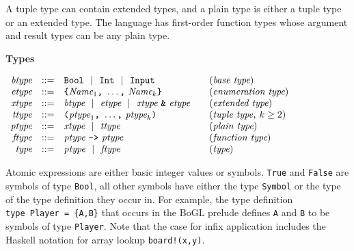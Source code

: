 \documentclass[11pt]{article}
\makeatletter
\newcommand{\prodName}[1]{&(\emph{#1})\\}
\newcommand{\nt}[1]{\textit{#1}}
\newcommand{\prog}[1]{\texttt{#1}}
\newcommand{\ORil}{\ \ |\ \ }
\newcommand{\IS}{&::=&}
\newcommand{\OR}{&|&}
\newcommand{\syntax}[2]{
  \needspace{3\baselineskip}
  \bigskip\par\noindent\textbf{#1}\par\smallskip%
  $\begin{array}{rcl@{\qquad}l}#2\end{array}$%
  \par\bigskip\noindent\ignorespaces
}
\newcommand{\lp}{\prog{(}}
\newcommand{\rp}{\prog{)}}
\newcommand{\paren}[1]{\lp#1\rp}
\makeatother
\begin{document}
A tuple type can contain extended types, and a plain type is either a tuple
type or an extended type. The language has first-order function types whose
argument and result types can be any plain type.

\syntax{Types}{
\nt{btype}    \IS  \prog{Bool} \ORil \prog{Int} \ORil \prog{Input}
                                                         \prodName{base type}
\nt{etype}    \IS  \prog{\{}\nt{Name}_1\prog{,}\ \ldots\prog{,}\ \nt{Name}_k \prog{\}}               \prodName{enumeration type}
\nt{xtype}    \IS  \nt{btype} \ORil \nt{etype} \ORil
                   \nt{xtype}\ \prog{\&}\ \nt{etype}
                                                       \prodName{extended type}
\nt{ttype}    \IS  \paren{\nt{ptype}_1\prog{,}\ \ldots\prog{,}\ \nt{ptype}_k}
                                               \prodName{tuple type, $k\geq 2$}
\nt{ptype}     \IS  \nt{xtype} \ORil \nt{ttype}
                                                          \prodName{plain type}
\nt{ftype}    \IS  \nt{ptype}\ \prog{->}\ \nt{ptype}   \prodName{function type}
\nt{type}     \IS  \nt{ptype} \ORil \nt{ftype}                  \prodName{type}
}
%
Atomic expressions are either basic integer values or symbols. \prog{True} and
\prog{False} are symbols of type \prog{Bool}, all other symbols have either the
type \prog{Symbol} or the type of the type definition they occur in. For
example, the type definition \prog{type~Player~=~\{A,B\}} that occurs in the
BoGL prelude defines \prog{A} and \prog{B} to be symbols of type \prog{Player}.
%
Note that the case for infix application includes the Haskell notation for
array lookup \prog{board!(x,y)}.
\end{document}
